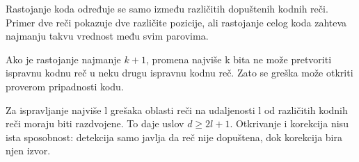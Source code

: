 Rastojanje koda određuje se samo između različitih dopuštenih kodnih reči. Primer dve reči pokazuje dve različite pozicije, ali rastojanje celog koda zahteva najmanju takvu vrednost među svim parovima.

Ako je rastojanje najmanje $k+1$, promena najviše k bita ne može pretvoriti ispravnu kodnu reč u neku drugu ispravnu kodnu reč. Zato se greška može otkriti proverom pripadnosti kodu.

Za ispravljanje najviše l grešaka oblasti reči na udaljenosti l od različitih kodnih reči moraju biti razdvojene. To daje uslov $d\ge2l+1$. Otkrivanje i korekcija nisu ista sposobnost: detekcija samo javlja da reč nije dopuštena, dok korekcija bira njen izvor.
